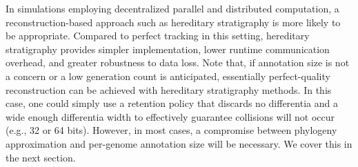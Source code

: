 \begin{enumerate}
In simulations employing decentralized parallel and distributed computation, a reconstruction-based approach such as hereditary stratigraphy is more likely to be appropriate.
Compared to perfect tracking in this setting, hereditary stratigraphy provides simpler implementation, lower runtime communication overhead, and greater robustness to data loss.
Note that, if annotation size is not a concern or a low generation count is anticipated, essentially perfect-quality reconstruction can be achieved with hereditary stratigraphy methods.
In this case, one could simply use a retention policy that discards no differentia and a wide enough differentia width to effectively guarantee collisions will not occur (e.g., 32 or 64 bits).
However, in most cases, a compromise between phylogeny approximation and per-genome annotation size will be necessary.
We cover this in the next section.


\end{enumerate}
